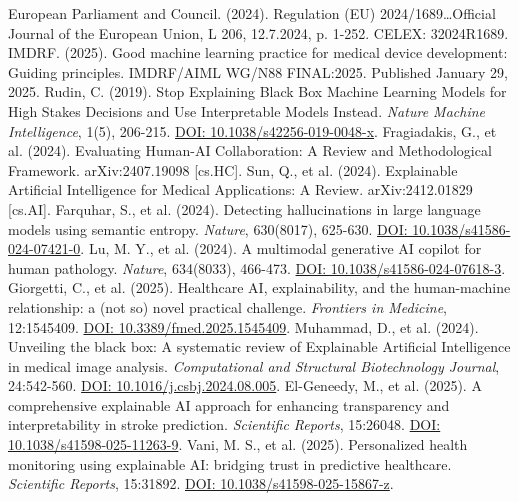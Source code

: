 \documentclass[11pt,a4paper]{article}
\begin{document}
\begin{thebibliography}{99}
 European Parliament and Council. (2024). Regulation (EU) 2024/1689\ldots Official Journal of the European Union, L 206, 12.7.2024, p. 1-252. CELEX: 32024R1689.  
 IMDRF. (2025). Good machine learning practice for medical device development: Guiding principles. IMDRF/AIML WG/N88 FINAL:2025. Published January 29, 2025.  
 Rudin, C. (2019). Stop Explaining Black Box Machine Learning Models for High Stakes Decisions and Use Interpretable Models Instead. \textit{Nature Machine Intelligence}, 1(5), 206-215. \href{https://doi.org/10.1038/s42256-019-0048-x}{DOI: 10.1038/s42256-019-0048-x}.  
 Fragiadakis, G., et al. (2024). Evaluating Human-AI Collaboration: A Review and Methodological Framework. arXiv:2407.19098 [cs.HC].  
 Sun, Q., et al. (2024). Explainable Artificial Intelligence for Medical Applications: A Review. arXiv:2412.01829 [cs.AI].  
 Farquhar, S., et al. (2024). Detecting hallucinations in large language models using semantic entropy. \textit{Nature}, 630(8017), 625-630. \href{https://doi.org/10.1038/s41586-024-07421-0}{DOI: 10.1038/s41586-024-07421-0}.  
 Lu, M. Y., et al. (2024). A multimodal generative AI copilot for human pathology. \textit{Nature}, 634(8033), 466-473. \href{https://doi.org/10.1038/s41586-024-07618-3}{DOI: 10.1038/s41586-024-07618-3}.  
 Giorgetti, C., et al. (2025). Healthcare AI, explainability, and the human-machine relationship: a (not so) novel practical challenge. \textit{Frontiers in Medicine}, 12:1545409. \href{https://doi.org/10.3389/fmed.2025.1545409}{DOI: 10.3389/fmed.2025.1545409}.  
 Muhammad, D., et al. (2024). Unveiling the black box: A systematic review of Explainable Artificial Intelligence in medical image analysis. \textit{Computational and Structural Biotechnology Journal}, 24:542-560. \href{https://doi.org/10.1016/j.csbj.2024.08.005}{DOI: 10.1016/j.csbj.2024.08.005}.  
 El-Geneedy, M., et al. (2025). A comprehensive explainable AI approach for enhancing transparency and interpretability in stroke prediction. \textit{Scientific Reports}, 15:26048. \href{https://doi.org/10.1038/s41598-025-11263-9}{DOI: 10.1038/s41598-025-11263-9}.  
 Vani, M. S., et al. (2025). Personalized health monitoring using explainable AI: bridging trust in predictive healthcare. \textit{Scientific Reports}, 15:31892. \href{https://doi.org/10.1038/s41598-025-15867-z}{DOI: 10.1038/s41598-025-15867-z}.  

\end{thebibliography}
\end{document}
